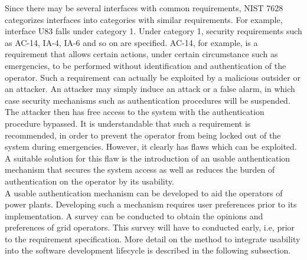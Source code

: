 Since there may be several interfaces with common requirements, NIST 7628 categorizes interfaces into categories with similar requirements. For example, interface U83 falls under category 1. Under category 1, security requirements such as AC-14, IA-4, IA-6 and so on are specified. AC-14, for example, is a requirement that allows certain actions, under certain circumstance such as emergencies, to be performed without identification and authentication of the operator. Such a requirement can actually be exploited by a malicious outsider or an attacker. An attacker may simply induce an attack or a false alarm, in which case security mechanisms such as authentication procedures will be suspended. The attacker then has free access to the system with the authentication procedure bypassed. It is understandable that such a requirement is recommended, in order to prevent the operator from being locked out of the system during emergencies. However, it clearly has flaws which can be exploited. A suitable solution for this flaw is the introduction of an usable authentication mechanism that secures the system access as well as reduces the burden of authentication on the operator by its usability.\\

A usable authentication mechanism can be developed to aid the operators of power plants. Developing such a mechanism requires user preferences prior to its implementation. A survey can be conducted to obtain the opinions and preferences of grid operators. This survey will have to conducted early, i.e, prior to the requirement specification. More detail on the method to integrate usability into the software development lifecycle is described in the following subsection.



